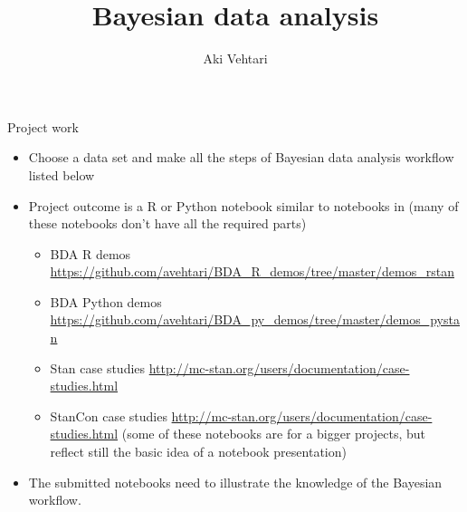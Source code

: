 \documentclass[t]{beamer}
\title[]{Bayesian data analysis}
\subtitle{}
\author{Aki Vehtari}
\institute[Aalto]{}
\begin{document}
\begin{frame}

  {\Large\color{navyblue} Project work}
  
  \begin{itemize}
  \item Choose a data set and make all the steps of Bayesian data
    analysis workflow listed below
  \item Project outcome is a R or Python notebook similar to notebooks
    in (many of these notebooks don't have all the required parts)
    \begin{itemize}
    \item BDA R demos \url{https://github.com/avehtari/BDA_R_demos/tree/master/demos_rstan}
    \item BDA Python demos \url{https://github.com/avehtari/BDA_py_demos/tree/master/demos_pystan}
    \item Stan case studies \url{http://mc-stan.org/users/documentation/case-studies.html}
    \item StanCon case studies \url{http://mc-stan.org/users/documentation/case-studies.html}
      (some of these notebooks are for a bigger projects, but reflect still the basic idea of a notebook presentation)
    \end{itemize}
  \item The submitted notebooks need to illustrate the knowledge of the
    Bayesian workflow.
  \end{itemize}
\end{frame}
\end{document}
